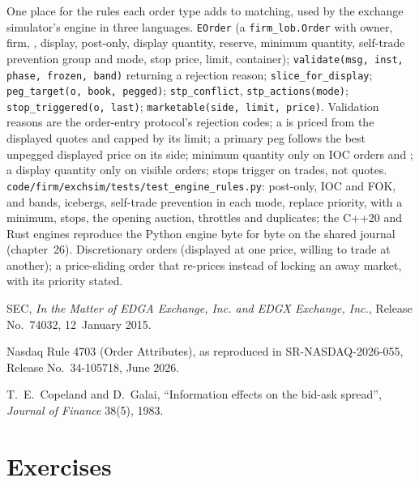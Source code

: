 \begin{build}
 One place for the rules each order type adds to matching, used by the exchange simulator's engine in three languages.
 \texttt{EOrder} (a \texttt{firm\_lob.Order} with owner, firm, , display, post-only, display quantity, reserve, minimum
quantity, self-trade prevention group and mode, stop price, limit, container); \texttt{validate(msg, inst, phase, frozen, band)} returning a rejection
reason; \texttt{slice\_for\_display}; \texttt{peg\_target(o, book, pegged)}; \texttt{stp\_conflict}, \texttt{stp\_actions(mode)};
\texttt{stop\_triggered(o, last)}; \texttt{marketable(side, limit, price)}.
 Validation reasons are the order-entry protocol's rejection codes; a  is priced from the displayed quotes and capped by its
limit; a primary peg follows the best unpegged displayed price on its side; minimum quantity only on IOC orders and ; a display quantity
only on visible orders; stops trigger on trades, not quotes.
 \texttt{code/firm/exchsim/tests/test\_engine\_rules.py}: post-only, IOC and FOK,  and bands, icebergs, self-trade
prevention in each mode, replace priority,  with a minimum, stops, the opening auction, throttles and duplicates; the C++20 and Rust engines
reproduce the Python engine byte for byte on the shared journal (chapter~26).
 Discretionary orders (displayed at one price, willing to trade at another); a price-sliding order that re-prices instead of locking an
away market, with its priority stated.
\end{build}

\begin{omsources}
\item SEC, \emph{In the Matter of EDGA Exchange, Inc. and EDGX Exchange, Inc.}, Release No.~74032, 12~January 2015.
\item Nasdaq Rule 4703 (Order Attributes), as reproduced in SR-NASDAQ-2026-055, Release No.~34-105718, June 2026.
\item T.~E.~Copeland and D.~Galai, ``Information effects on the bid-ask spread'', \emph{Journal of Finance} 38(5), 1983.
\end{omsources}

\section{Exercises}


